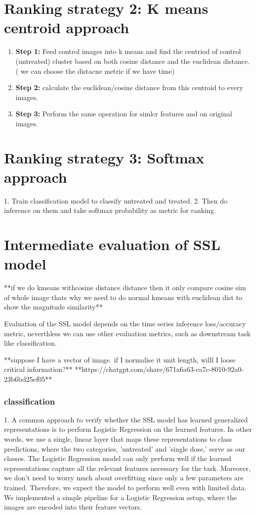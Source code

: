 \section{Ranking strategy 2: K means centroid approach}

\begin{enumerate}
  \item \textbf{Step 1:} Feed control images into k means and find the centriod of control (untreated) cluster based on both cosine distance and the euclidean distance. 
  ( we can choose the distacne metric if we have time)
  
  \item \textbf{Step 2:} calculate the euclidean/cosine distance from this centroid to every images.
  
  \item \textbf{Step 3:} Perform the same operation for simlcr features and on original images.
\end{enumerate}

\section{Ranking strategy 3: Softmax approach}
1. Train classification model to classify untreated and treated. 
2. Then do inference on them and take softmax probability as metric for ranking.

\section{Intermediate evaluation of SSL model}

**if we do kmeans withcosine distance distance then it only compare cosine sim of whole image thats why we need to do normal kmeans with euclidean dist to show 
the magnitude similarity** 

Evaluation of the SSL model depends on the  time series inference loss/accuracy metric, neverthless we can use other evaluation metrics, such as downstream task 
like classification. 

**suppose I have a vector of image. if I normalise it unit length, willl I loose critical information?**
**https://chatgpt.com/share/671a6a63-ca7c-8010-92a0-23b6bd25ef05**

\subsubsection{classification}
1. A common approach to verify whether the SSL model has learned generalized representations is to perform Logistic Regression on the learned features.
 In other words, we use a single, linear layer that maps these representations to class predictions, where the two categories, 'untreated' and 'single dose,' 
 serve as our classes. The Logistic Regression model can only perform well if the learned representations capture all the relevant features necessary for the task. 
 Moreover, we don't need to worry much about overfitting since only a few parameters are trained. Therefore, we expect the model to perform well even with limited data.
  We implemented a simple pipeline for a Logistic Regression setup, where the images are encoded into their feature vectors.

